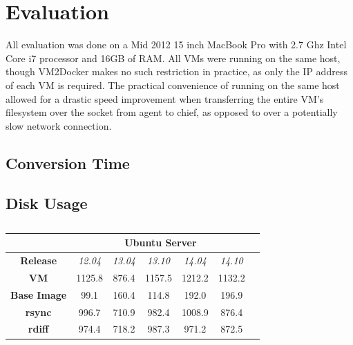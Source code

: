 \chapter{Evaluation}
All evaluation was done on a Mid 2012 15 inch MacBook Pro with 2.7 Ghz Intel Core i7 processor and 16GB of RAM. All VMs were running on the same host, though VM2Docker makes no such restriction in practice, as only the IP address of each VM is required. The practical convenience of running on the same host allowed for a drastic speed improvement when transferring the entire VM's filesystem over the socket from agent to chief, as opposed to over a potentially slow network connection.
\label{chap:eval}
\section{Conversion Time}
\section{Disk Usage}
\begin{table}[h]
\centering
    \begin{tabular}{| c | c | c | c | c | c | c |}
    \hline
& \multicolumn{5}{|c|}{\bfseries Ubuntu Server} \\ \hline
    \bfseries Release & \itshape 12.04 & \itshape 13.04 & \itshape 13.10 & \itshape 14.04 & \itshape 14.10 \\ \hline
    \bfseries VM & 1125.8 & 876.4 & 1157.5 & 1212.2 & 1132.2\\ \hline
    \bfseries Base Image & 99.1 & 160.4 & 114.8 & 192.0 & 196.9  \\ \hline
    \bfseries rsync & 996.7 & 710.9 & 982.4 & 1008.9 & 876.4\\ \hline 
    \bfseries rdiff & 974.4 & 718.2 & 987.3 & 971.2 & 872.5\\ \hline 
    \end{tabular}
\caption{}
\label{table:diff}
\end{table}

